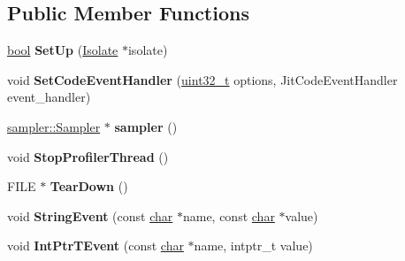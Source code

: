 \subsection*{Public Member Functions}
\begin{DoxyCompactItemize}
\item 
\mbox{\label{classv8_1_1internal_1_1Logger_a57c1357e2efcb8f18a9463b3738de1c3}} 
\mbox{\hyperlink{classbool}{bool}} {\bfseries Set\+Up} (\mbox{\hyperlink{classv8_1_1internal_1_1Isolate}{Isolate}} $\ast$isolate)
\item 
\mbox{\label{classv8_1_1internal_1_1Logger_a89f5788193b8b60cc23095b01b303278}} 
void {\bfseries Set\+Code\+Event\+Handler} (\mbox{\hyperlink{classuint32__t}{uint32\+\_\+t}} options, Jit\+Code\+Event\+Handler event\+\_\+handler)
\item 
\mbox{\label{classv8_1_1internal_1_1Logger_aa3ba1fdbb0a32a440540bb6ff6630077}} 
\mbox{\hyperlink{classv8_1_1sampler_1_1Sampler}{sampler\+::\+Sampler}} $\ast$ {\bfseries sampler} ()
\item 
\mbox{\label{classv8_1_1internal_1_1Logger_ac8018c72b3bfa833a8e9d1f5701c5570}} 
void {\bfseries Stop\+Profiler\+Thread} ()
\item 
\mbox{\label{classv8_1_1internal_1_1Logger_aecd345473e60fedd6cf022514b460ade}} 
F\+I\+LE $\ast$ {\bfseries Tear\+Down} ()
\item 
\mbox{\label{classv8_1_1internal_1_1Logger_aa5b4d8a0c983f1302a86943394481ef8}} 
void {\bfseries String\+Event} (const \mbox{\hyperlink{classchar}{char}} $\ast$name, const \mbox{\hyperlink{classchar}{char}} $\ast$value)
\item 
\mbox{\label{classv8_1_1internal_1_1Logger_add38edf4ef5cb1d654eb9cac76f53136}} 
void {\bfseries Int\+Ptr\+T\+Event} (const \mbox{\hyperlink{classchar}{char}} $\ast$name, intptr\+\_\+t value)
\item 
\mbox{\label{classv8_1_1internal_1_1Logger_a6dffb059d816744e4c85150d2acb480a}} 

\end{DoxyCompactItemize}
